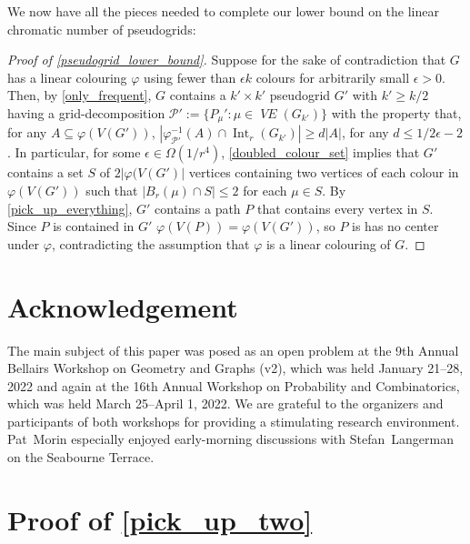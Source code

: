 \documentclass{patmorin}
\DeclareMathOperator{\interior}{Int}
\DeclareMathOperator{\VE}{\mathit{VE}}
\begin{document}
We now have all the pieces needed to complete our lower bound on the linear chromatic number of pseudogrids:

\begin{proof}[Proof of \cref{pseudogrid_lower_bound}]
  Suppose for the sake of contradiction that $G$ has a linear colouring $\varphi$ using fewer than $\epsilon k$ colours for arbitrarily small $\epsilon >0$.  Then, by \cref{only_frequent}, $G$ contains a $k'\times k'$ pseudogrid $G'$ with $k'\ge k/2$ having a grid-decomposition $\mathcal{P}':=\{P_\mu':\mu\in \VE(G_{k'})\}$ with the property that, for any $A\subseteq\varphi(V(G'))$, $|\varphi^{-1}_{\mathcal{P'}}(A)\cap\interior_r(G_{k'})|\ge d|A|$, for any $d\le 1/2\epsilon-2$.  In particular, for some $\epsilon \in \Omega(1/r^4)$, \cref{doubled_colour_set} implies that $G'$ contains a set $S$ of $2|\varphi(V(G')|$ vertices containing two vertices of each colour in $\varphi(V(G'))$ such that $|B_r(\mu)\cap S|\le 2$ for each $\mu\in S$.  By \cref{pick_up_everything}, $G'$ contains a path $P$ that contains every vertex in $S$.  Since $P$ is contained in $G'$ $\varphi(V(P))=\varphi(V(G'))$, so $P$ is has no center under $\varphi$, contradicting the assumption that $\varphi$ is a linear colouring of $G$.
\end{proof}


\section*{Acknowledgement}

The main subject of this paper was posed as an open problem at the 9th Annual Bellairs Workshop on Geometry and Graphs (v2), which was held January 21--28, 2022 and again at the 16th Annual Workshop on Probability and Combinatorics, which was held March 25--April 1, 2022. We are grateful to the organizers and participants of both workshops for providing a stimulating research environment.
Pat~Morin especially enjoyed early-morning discussions with Stefan~Langerman on the Seabourne Terrace.






\appendix
\section{Proof of \cref{pick_up_two}}
\label{pick_up_two_proof}
\end{document}
